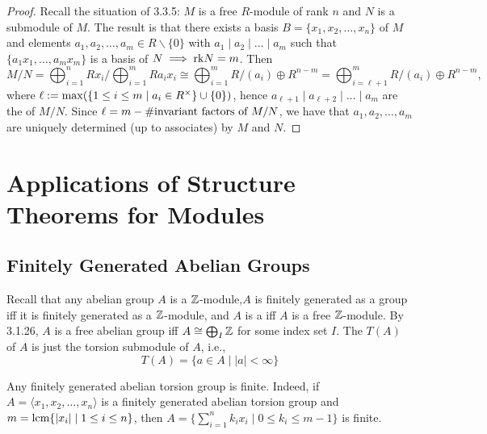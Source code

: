 \documentclass[11pt]{book}
\theoremstyle{definition}   \newtheorem{defn}[counter]{Definition} %
\newcommand{\bs}{\backslash}   \newcommand{\A}{\mathcal{A}}   \newcommand{\sy}{\textnormal{Syl}}   \newcommand{\size}[1]{\left| #1 \right|}
\newcommand{\gen}[1]{\langle #1 \rangle}   \newcommand{\stab}[2]{\tn{Stab}_{#1}(#2)}   \newcommand{\fix}[2]{\tn{Fix}_{#1}(#2)}   \newcommand{\op}{^{\tn{op}}}
\newcommand{\vs}{\vspace{8pt}}
\numberwithin{counter}{chapter}
\begin{document}
\begin{proof}
Recall the situation of 3.3.5: $M$ is a free $R$-module of rank $n$ and $N$ is a submodule of $M$. The result is that there exists a basis $B = \{x_1,x_2,\dots,x_n\}$ of $M$ and elements $a_1,a_2,\dots,a_m \in R\bs\{0\}$ with $a_1 \mid a_2 \mid \dots \mid a_m$ such that $\{a_1x_1,\dots,a_mx_m\}$ is a basis of $N \implies \textnormal{rk} N = m$. Then
	\[M/N = \bigoplus_{i=1}^n R x_i/\bigoplus_{i=1}^m R a_i x_i \cong \bigoplus_{i=1}^m R/(a_i) \oplus R^{n-m} = \bigoplus_{i=\ell+1}^m R/(a_i) \oplus R^{n-m}, \]
where $\ell := \max(\{1 \leq i \leq m \mid a_i \in R^{\times}\} \cup \{0\})$, hence $a_{\ell+1} \mid a_{\ell+2} \mid \dots \mid a_m$ are the  of $M/N$. Since $\ell = m - \#\textnormal{invariant factors of } M/N$, we have that $a_1,a_2,\dots,a_m$ are uniquely determined (up to associates) by $M$ and $N$.
\end{proof}





\chapter{Applications of Structure Theorems for Modules}



\section*{Finitely Generated Abelian Groups}

Recall that any abelian group $A$ is a $\operatorname{\mathbb{Z}}$-module,$A$ is finitely generated as a group iff it is finitely generated as a $\operatorname{\mathbb{Z}}$-module, and $A$ is a  iff $A$ is a free $\operatorname{\mathbb{Z}}$-module. By 3.1.26, $A$ is a free abelian group iff $A \cong \bigoplus_{I} \operatorname{\mathbb{Z}}$ for some index set $I$. The  $T(A)$ of $A$ is just the torsion submodule of $A$, i.e.,
	\[T(A) = \{a \in A \mid |a| < \infty\} \]

\begin{remark}
Any finitely generated abelian torsion group is finite. Indeed, if $A = \gen{x_1,x_2,\dots,x_n}$ is a finitely generated abelian torsion group and $m = \operatorname{\textrm{lcm}}\{|x_i| \mid 1 \leq i \leq n\}$, then $A = \{\sum_{i=1}^n k_i x_i \mid 0 \leq k_i \leq m-1\}$ is finite.
\end{remark}

\vs
\end{document}
